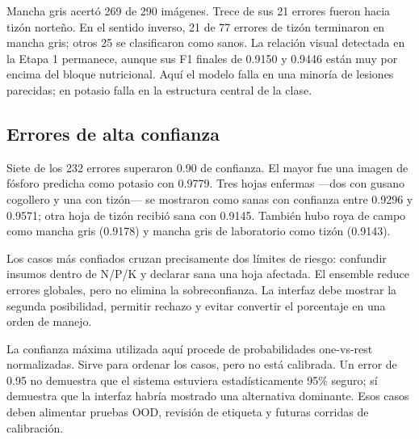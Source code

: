 Mancha gris acertó 269 de 290 imágenes. Trece de sus 21 errores fueron hacia
tizón norteño. En el sentido inverso, 21 de 77 errores de tizón terminaron en
mancha gris; otros 25 se clasificaron como sanos. La relación visual detectada
en la Etapa 1 permanece, aunque sus F1 finales de 0.9150 y 0.9446 están muy por
encima del bloque nutricional. Aquí el modelo falla en una minoría de lesiones
parecidas; en potasio falla en la estructura central de la clase.

\subsection{Errores de alta confianza}

Siete de los 232 errores superaron 0.90 de confianza. El mayor fue una imagen
de fósforo predicha como potasio con 0.9779. Tres hojas enfermas ---dos con
gusano cogollero y una con tizón--- se mostraron como sanas con confianza entre
0.9296 y 0.9571; otra hoja de tizón recibió sana con 0.9145. También hubo roya
de campo como mancha gris (0.9178) y mancha gris de laboratorio como tizón
(0.9143).

Los casos más confiados cruzan precisamente dos límites de riesgo: confundir
insumos dentro de N/P/K y declarar sana una hoja afectada. El ensemble reduce
errores globales, pero no elimina la sobreconfianza. La interfaz debe mostrar
la segunda posibilidad, permitir rechazo y evitar convertir el porcentaje en
una orden de manejo.

La confianza máxima utilizada aquí procede de probabilidades one-vs-rest
normalizadas. Sirve para ordenar los casos, pero no está calibrada. Un error de
0.95 no demuestra que el sistema estuviera estadísticamente 95\% seguro; sí
demuestra que la interfaz habría mostrado una alternativa dominante. Esos
casos deben alimentar pruebas OOD, revisión de etiqueta y futuras corridas de
calibración.
